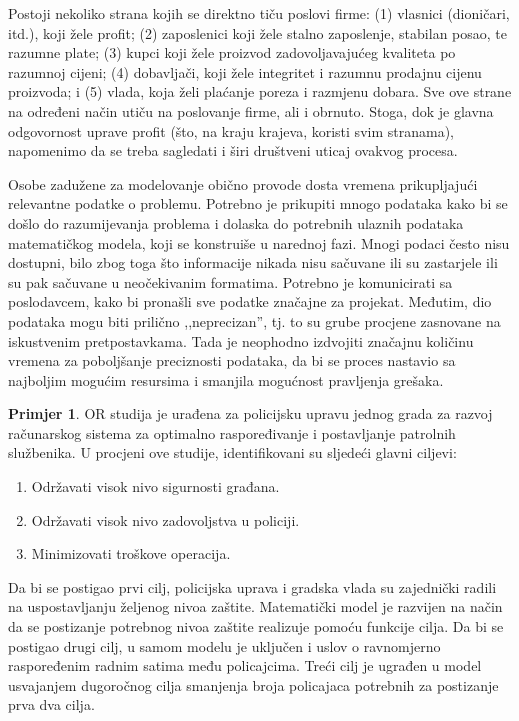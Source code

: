 \documentclass[b5paper, utf8, 11pt, colorlinks]{book}
\theoremstyle{definition}
\newtheorem{primjer}{Primjer}[chapter]
\begin{document}
 Postoji nekoliko strana kojih se direktno tiču poslovi firme: (1) vlasnici (dioničari, itd.), koji žele profit;   (2) zaposlenici koji žele stalno zaposlenje, stabilan posao, te razumne plate; (3) kupci koji žele proizvod zadovoljavajućeg kvaliteta po razumnoj cijeni;
 (4) dobavljači, koji žele integritet i razumnu prodajnu cijenu proizvoda; i
 (5) vlada, koja želi plaćanje poreza i razmjenu dobara. Sve ove strane na određeni način utiču na poslovanje firme, ali i obrnuto.  Stoga, dok je glavna odgovornost uprave profit (što, na kraju krajeva, koristi svim stranama), napomenimo da se treba sagledati i širi društveni uticaj ovakvog procesa. 
 
  Osobe zadužene za modelovanje obično provode dosta vremena prikupljajući relevantne podatke o problemu. Potrebno je prikupiti mnogo podataka kako bi se došlo do razumijevanja problema i dolaska do potrebnih ulaznih podataka matematičkog modela, koji se konstruiše u narednoj fazi.  Mnogi podaci često nisu dostupni, bilo zbog toga što informacije nikada nisu sačuvane ili su zastarjele ili su pak sačuvane u neočekivanim formatima. Potrebno je komunicirati sa poslodavcem, kako bi pronašli sve podatke značajne za projekat. Međutim, dio podataka mogu biti prilično ,,neprecizan'', tj. to su grube procjene zasnovane na iskustvenim pretpostavkama. Tada je neophodno izdvojiti značajnu količinu vremena za poboljšanje  
 preciznosti podataka, da bi se proces nastavio sa najboljim mogućim resursima i smanjila mogućnost pravljenja grešaka. 

  \begin{primjer}
  OR studija je urađena za policijsku upravu jednog grada %
 za razvoj računarskog sistema za optimalno raspoređivanje i postavljanje patrolnih službenika. U procjeni   ove studije, identifikovani su sljedeći glavni ciljevi:
 \begin{enumerate}
     \item  Održavati visok nivo sigurnosti građana.
     \item  Održavati visok nivo zadovoljstva u policiji.
      \item Minimizovati troškove operacija.
 \end{enumerate}
 Da bi se postigao prvi cilj, policijska uprava i gradska vlada  su zajednički radili na uspostavljanju željenog nivoa zaštite.  Matematički model je razvijen na način da se postizanje potrebnog nivoa zaštite realizuje pomoću funkcije cilja.  Da bi se postigao drugi cilj, u samom modelu je uključen i uslov o ravnomjerno raspoređenim radnim satima među policajcima. Treći cilj je ugrađen u model usvajanjem dugoročnog cilja smanjenja broja policajaca potrebnih za postizanje prva dva cilja. 
 \end{primjer}
\end{document}
